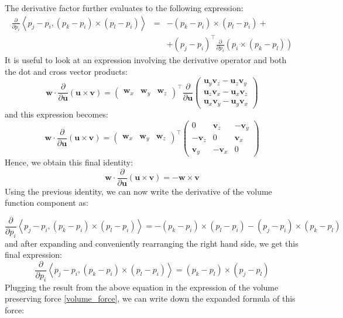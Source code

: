 \documentclass[12pt]{article}
\begin{document}
The derivative factor further evaluates to the following expression:
\begin{align*}
	\frac{\partial}{\partial p_i} \left\langle p_j - p_i, (p_k - p_i) \times (p_l - p_i)\right\rangle & = & - (p_k - p_i) \times (p_l - p_i) + \\
	& & + (p_j - p_i)^{\top} \frac{\partial}{\partial p_i}(p_i \times (p_k - p_l))
\end{align*}
It is useful to look at an expression involving the derivative operator and both the dot and cross vector products:
$$ 
\mathbf{w} \cdot \frac{\partial}{\partial \mathbf{u}} (\mathbf{u} \times \mathbf{v}) = 
\left(
\begin{array}{ccc}
\mathbf{w}_x & \mathbf{w}_y & \mathbf{w}_z
\end{array}
\right) ^ \top
\frac{\partial}{\partial \mathbf{u}} 
\left(
\begin{array}{c}
\mathbf{u}_y \mathbf{v}_z - \mathbf{u}_z \mathbf{v}_y \\
\mathbf{u}_z \mathbf{v}_x - \mathbf{u}_x \mathbf{v}_z \\
\mathbf{u}_x \mathbf{v}_y - \mathbf{u}_y \mathbf{v}_x
\end{array}
\right)
$$
and this expression becomes:
$$
\mathbf{w} \cdot \frac{\partial}{\partial \mathbf{u}} (\mathbf{u} \times \mathbf{v}) = 
\left(
\begin{array}{ccc}
\mathbf{w}_x & \mathbf{w}_y & \mathbf{w}_z
\end{array}
\right) ^ \top
\left(
\begin{array}{ccc}
0 & \mathbf{v}_z & - \mathbf{v}_y \\
- \mathbf{v}_z & 0 &  \mathbf{v}_x \\
 \mathbf{v}_y & -  \mathbf{v}_x & 0
 \end{array}
\right)
$$
Hence, we obtain this final identity:
\begin{equation}
\label{derivative_dot_cross}
\mathbf{w} \cdot \frac{\partial}{\partial \mathbf{u}} (\mathbf{u} \times \mathbf{v}) = - \mathbf{w} \times \mathbf{v}
\end{equation}
Using the previous identity, we can now write the derivative of the volume function component as:

\begin{equation}
	\frac{\partial}{\partial p_i} \left\langle p_j - p_i, (p_k - p_i) \times (p_l - p_i)\right\rangle = - (p_k - p_i) \times (p_l - p_i) - (p_j - p_i) \times (p_k - p_l)
\end{equation}
and after expanding and conveniently rearranging the right hand side, we get this final expression:
\begin{equation}
\label{final_dot_cross_derivative}
	\frac{\partial}{\partial p_i} \left\langle p_j - p_i, (p_k - p_i) \times (p_l - p_i)\right\rangle = (p_k - p_l) \times (p_j - p_l)
\end{equation}
Plugging the result from the above equation in the expression of the volume preserving force \ref{volume_force}, we can write down the expanded formula of this force:
\end{document}
